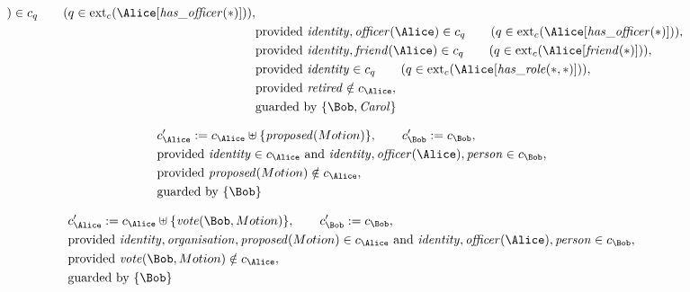 \begin{align*}
)
 \in c_
q
 \qquad (
q \in 
\mathrm{ext}_c(
\Alice
[
\mathit{\detokenize{
has_officer
}}
(
\ast
)
]
)
)
,\\
&
\text{provided } 
\mathit{\detokenize{
identity
}}
,
\mathit{\detokenize{
officer
}}
(
\Alice
)
 \in c_
q
 \qquad (
q \in 
\mathrm{ext}_c(
\Alice
[
\mathit{\detokenize{
has_officer
}}
(
\ast
)
]
)
)
,\\
&
\text{provided } 
\mathit{\detokenize{
identity
}}
,
\mathit{\detokenize{
friend
}}
(
\Alice
)
 \in c_
q
 \qquad (
q \in 
\mathrm{ext}_c(
\Alice
[
\mathit{\detokenize{
friend
}}
(
\ast
)
]
)
)
,\\
&
\text{provided } 
\mathit{\detokenize{
identity
}}
 \in c_
q
 \qquad (
q \in 
\mathrm{ext}_c(
\Alice
[
\mathit{\detokenize{
has_role
}}
(
\ast
,
\ast
)
]
)
)
,\\
&
\text{provided } 
\mathit{\detokenize{
retired
}}
 \notin c_
{
\Alice
}
,\\
&
\text{guarded by } \{
\Bob
,
\mathit{Carol}
\}
\end{align*}

\begin{align*}
&
c'_
{
\Alice
}
 := 
c_
{
\Alice
}
 \uplus 
\{
\mathit{\detokenize{
proposed
}}
(
Motion
)
\}
, \qquad 
c'_
{
\Bob
}
 := 
c_
{
\Bob
}
,\\
&
\text{provided } 
\mathit{\detokenize{
identity
}}
 \in c_
{
\Alice
}
 \text{ and } 
\mathit{\detokenize{
identity
}}
,
\mathit{\detokenize{
officer
}}
(
\Alice
)
,
\mathit{\detokenize{
person
}}
 \in c_
{
\Bob
}
,\\
&
\text{provided } 
\mathit{\detokenize{
proposed
}}
(
Motion
)
 \notin c_
{
\Alice
}
,\\
&
\text{guarded by } \{
\Bob
\}
\end{align*}

\begin{align*}
&
c'_
{
\Alice
}
 := 
c_
{
\Alice
}
 \uplus 
\{
\mathit{\detokenize{
vote
}}
(
\Bob
,
Motion
)
\}
, \qquad 
c'_
{
\Bob
}
 := 
c_
{
\Bob
}
,\\
&
\text{provided } 
\mathit{\detokenize{
identity
}}
,
\mathit{\detokenize{
organisation
}}
,
\mathit{\detokenize{
proposed
}}
(
Motion
)
 \in c_
{
\Alice
}
 \text{ and } 
\mathit{\detokenize{
identity
}}
,
\mathit{\detokenize{
officer
}}
(
\Alice
)
,
\mathit{\detokenize{
person
}}
 \in c_
{
\Bob
}
,\\
&
\text{provided } 
\mathit{\detokenize{
vote
}}
(
\Bob
,
Motion
)
 \notin c_
{
\Alice
}
,\\
&
\text{guarded by } \{
\Bob
\}
\end{align*}
